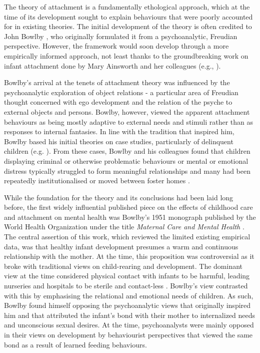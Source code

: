 \documentclass[12pt]{report}
\begin{document}
The theory of attachment is a fundamentally ethological approach, which at the time of its development sought to explain behaviours that were poorly accounted for in existing theories.
The initial development of the theory is often credited to John Bowlby \cite{Bowlby1969attachment,Bowlby1973separation,Bowlby1980loss}, who originally formulated it from a psychoanalytic, Freudian perspective.
However, the framework would soon develop through a more empirically informed approach, not least thanks to the groundbreaking work on infant attachment done by Mary Ainsworth and her colleagues (e.g., ).

Bowlby's arrival at the tenets of attachment theory was influenced by the psychoanalytic exploration of object relations - a particular area of Freudian thought concerned with ego development and the relation of the psyche to external objects and persons.
Bowlby, however, viewed the apparent attachment behaviours as being mostly adaptive to external needs and stimuli rather than as responses to internal fantasies. In line with the tradition that inspired him, Bowlby based his initial theories on case studies, particularly of delinquent children (e.g. ). From these cases, Bowlby and his colleagues found that children displaying criminal or otherwise problematic behaviours or mental or emotional distress typically struggled to form meaningful relationships and many had been repeatedly institutionalised or moved between foster homes \cite{bowlby1951WHO}.

While the foundation for the theory and its conclusions had been laid long before, the first widely influential published piece on the effects of childhood care and attachment on mental health was Bowlby's 1951 monograph published by the World Health Organization under the title \textit{Maternal Care and Mental Health} \cite{bowlby1951WHO}.
The central assertion of this work, which reviewed the limited existing empirical data, was that healthy infant development presumes a warm and continuous relationship with the mother.
At the time, this proposition was controversial as it broke with traditional views on child-rearing and development. The dominant view at the time considered physical contact with infants to be harmful, leading nurseries and hospitals to be sterile and contact-less \cite{Karen1994}.
Bowlby's view contrasted with this by emphasising the relational and emotional needs of children. As such, Bowlby found himself opposing the psychoanalytic views that originally inspired him and that attributed the infant's bond with their mother to internalized needs and unconscious sexual desires.
At the time, psychoanalysts were mainly opposed in their views on development by behaviourist perspectives that viewed the same bond as a result of learned feeding behaviours.
\end{document}
